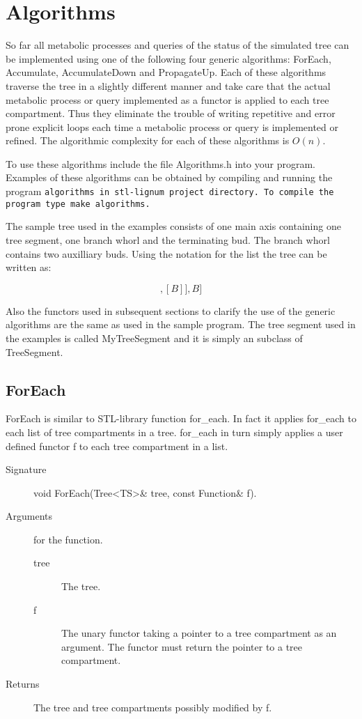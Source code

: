 \section{Algorithms}

So far   all metabolic processes  and   queries of the status   of the
simulated tree can  be implemented  using  one of the  following  four
generic algorithms:      ForEach,     Accumulate,  AccumulateDown  and
PropagateUp.  Each of these algorithms traverse the tree in a slightly
different manner  and take care that the   actual metabolic process or
query implemented as  a functor is  applied to  each tree compartment.
Thus they eliminate the trouble of writing  repetitive and error prone
explicit loops each  time a metabolic process  or query is implemented
or refined. The algorithmic complexity for each of these algorithms is
$O(n)$.

To  use   these algorithms  include the  file  Algorithms.h  into your
program. Examples of these algorithms can be obtained by compiling and
running  the  program  \tt   algorithms   \rm  in stl-lignum   project
directory.  To compile the program type \tt make algorithms\rm.


The sample  tree  used in  the   examples consists  of one  main  axis
containing one tree segment, one branch whorl and the terminating bud.
The branch whorl contains two  auxilliary buds. Using the notation for
the list the tree can be written as:

\begin{displaymath}
[TS,[[B],[B]],B]
\end{displaymath}

Also the  functors used in subsequent  sections to clarify  the use of
the generic algorithms are the same as used in the sample program. The
tree segment  used in the examples  is called MyTreeSegment  and it is
simply an subclass of TreeSegment.
 
\subsection{ForEach}

ForEach is similar to  STL-library  function  for\_each.  In fact   it
applies  for\_each to  each  list  of  tree  compartments  in a  tree.
for\_each in turn simply applies a user defined functor f to each tree
compartment in a list.

\begin{description}
    \item [Signature] void ForEach(Tree<TS>\& tree, const Function\& f).
    \item [Arguments] for the function.
      \begin{description}
        \item [tree] The tree.
        \item [f]  The unary   functor  taking a   pointer to a   tree
      compartment as an argument. The functor  must return the pointer
      to a tree compartment.
     \end{description} 
   \item[Returns] The tree and tree compartments possibly modified by f.
\end{description} 

